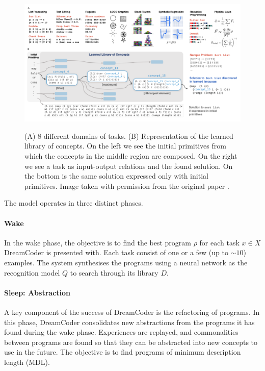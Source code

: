 \begin{figure}
\includegraphics[width=\textwidth]{img/conc_library.png}
\label{fig:conc_library}
\caption{(A) 8 different domains of tasks. (B) Representation of the learned library of concepts. On the left we see the initial primitives from which the concepts in the middle region are composed. On the right we see a task as input-output relations and the found solution. On the bottom is the same solution expressed only with initial primitives. Image taken with permission from the original paper \cite{ellis_dreamcoder_2021}.}
\end{figure}

The model operates in three distinct phases. 

\paragraph{Wake} In the wake phase, the objective is to find the best program $\rho$  for each task $x \in X$ DreamCoder is presented with. Each task consist of one or a few (up to $\sim10$) examples. The system synthesises the programs using a neural network as the recognition model $Q$ to search through its library $D$.

\paragraph{Sleep: Abstraction} A key component of the success of DreamCoder is the refactoring of programs. In this phase, DreamCoder consolidates new abstractions from the programs it has found during the wake phase. Experiences are replayed, and commonalities between programs are found so that they can be abstracted into new concepts to use in the future. The objective is to find programs of minimum description length (MDL). 

